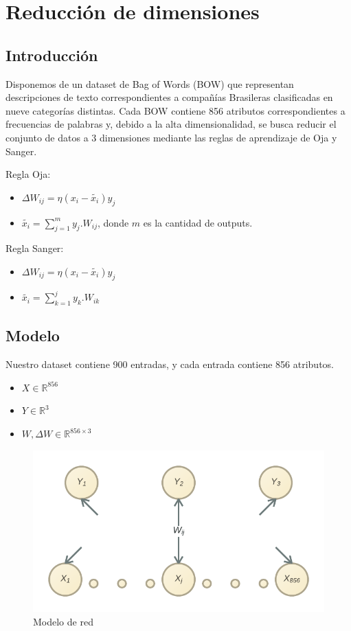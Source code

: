 \section{Reducción de dimensiones}

\subsection{Introducción}

Disponemos de un dataset de Bag of Words (BOW) que representan descripciones de texto correspondientes a compañías Brasileras clasificadas en nueve categorías distintas. Cada BOW contiene 856 atributos correspondientes a frecuencias de palabras y, debido a la alta dimensionalidad, se busca reducir el conjunto de datos a 3 dimensiones mediante las reglas de aprendizaje de Oja y Sanger.

Regla Oja:
\begin{itemize}
	\item$\Delta W_{ij} = \eta (x_i - \widetilde{x_i}) y_j$
	\item$\widetilde{x_i} = \sum_{j=1}^m y_j . W_{ij}$, donde $m$ es la cantidad de outputs.
\end{itemize}

Regla Sanger:
\begin{itemize}
	\item$\Delta W_{ij} = \eta (x_i - \widetilde{x_i}) y_j$
	\item$\widetilde{x_i} = \sum_{k=1}^j y_k . W_{ik}$
\end{itemize}

\subsection{Modelo}

Nuestro dataset contiene 900 entradas, y cada entrada contiene 856 atributos.

\begin{itemize}
	\item$X \in \mathbb{R}^{856}$
	\item$Y \in \mathbb{R}^3$
	\item$W, \Delta W \in \mathbb{R}^{856\times 3}$
\end{itemize}

\begin{figure}[ht!]
	\centering
	\includegraphics[width=0.7\linewidth]{img/parte1-modelo.png}

	\caption{Modelo de red}
\end{figure}


